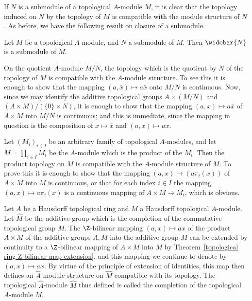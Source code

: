 If $N$ is a submodule of a topological $A$-module $M$, it is clear that the topology induced on $N$ by the topology of $M$ is compatible with the module structure of $N$. As before, we have the following result on closure of a submodule.
\begin{proposition}
Let $M$ be a topological $A$-module, and $N$ a submodule of $M$. Then $\widebar{N}$ is a submodule of $M$.
\end{proposition}
On the quotient $A$-module $M/N$, the topology which is the quotient by $N$ of the topology of $M$ is compatible with the $A$-module structure. To see this it is enough to show that the mapping $(a,\bar{x})\mapsto a\bar{x}$ onto $M/N$ is continuous. Now, since we may identify the additive topological groups $A\times(M/N)$ and $(A\times M)/(\{0\}\times N)$, it is enough to show that the mapping $(a,x)\mapsto a\bar{x}$ of $A\times M$ into $M/N$ is continuous; and this is immediate, since the mapping in question is the composition of $x\mapsto\bar{x}$ and $(a,x)\mapsto ax$.\par
Let $(M_i)_{i\in I}$ be an arbitrary family of topological $A$-modules, and let $M=\prod_{i\in I}M_i$ be the $A$-module which is the product of the $M_i$. Then the product topology on $M$ is compatible with the $A$-module structure of $M$. To prove this it is enough to show that the mapping  $(a,x)\mapsto(a\pi_i(x))$ of $A\times M$ into $M$ is continuous, or that for each index $i\in I$ the mapping $(a,x)\mapsto a\pi_i(x)$ is a continuous mapping of $A\times M\to M_i$, which is obvious.\par
Let $A$ be a Hausdorff topological ring and $M$ a Hausdorff topological $A$-module. Let $\widehat{M}$ be the additive group which is the completion of the commutative topological group $M$. The $\Z$-bilinear mapping $(a,x)\mapsto ax$ of the product $A\times M$ of the additive groups $A,M$ into the additive group $M$ can be extended by continuity to a $\Z$-bilinear mapping of $A\times M$ into $M$ by Theorem~\ref{topological ring Z-bilinear map extension}, and this mapping we continue to denote by $(a,x)\mapsto ax$. By virtue of the principle of extension of identities, this map then defines an $\widehat{A}$-module structure on $\widehat{M}$ compatible with its topology. The topological $\widehat{A}$-module $\widehat{M}$ thus defined is called the completion of the topological $A$-module $M$.\par
